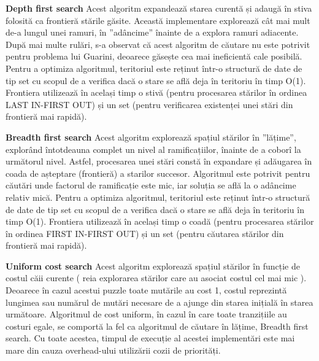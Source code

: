 \documentclass{article}
\begin{document}
    
   \textbf{ Depth first search} \hfill \break  
        Acest algoritm expandează starea curentă și adaugă în stiva folosită ca frontieră stările găsite. Această implementare explorează cât mai mult de-a lungul unei ramuri, în ”adâncime” înainte de a explora ramuri adiacente. După mai multe rulări, s-a observat că acest algoritm de căutare nu este potrivit pentru problema lui Guarini, deoarece găsește cea mai ineficientă cale posibilă.
        \hfill \break
        Pentru a optimiza algoritmul, teritoriul este reținut într-o structură de date de tip set cu scopul de a verifica dacă o stare se află deja în teritoriu în timp O(1). Frontiera utilizează în același timp o stivă (pentru procesarea stărilor în ordinea LAST IN-FIRST OUT) și un set (pentru verificarea existenței unei stări din frontieră mai rapidă).
        
        
    \textbf{Breadth first search}\hfill \break
        Acest algoritm explorează spațiul stărilor în ”lățime”, explorând întotdeauna complet un nivel al ramificațiilor, înainte de a coborî la următorul nivel. Astfel, procesarea unei stări constă în expandare și adăugarea în coada de așteptare (frontieră) a starilor succesor. Algoritmul este potrivit pentru căutări unde factorul de ramificație este mic, iar soluția se află la o adâncime relativ mică.\hfill \break
        Pentru a optimiza algoritmul, teritoriul este reținut într-o structură de date de tip set cu scopul de a verifica dacă o stare se află deja în teritoriu în timp O(1). Frontiera utilizează în același timp o coadă (pentru procesarea stărilor în ordinea FIRST IN-FIRST OUT) și un set (pentru căutarea stărilor din frontieră mai rapidă).

            
    \textbf{Uniform cost search}\hfill \break
        Acest algoritm explorează spațiul stărilor în funcție de costul căii curente ( reia explorarea stărilor care au asociat costul cel mai mic ). Deoarece în cazul acestui puzzle toate mutările au cost 1, costul reprezintă lungimea sau numărul de mutări necesare de a ajunge din starea inițială în starea următoare. Algoritmul de cost uniform, în cazul în care toate tranzițiile au costuri egale, se comportă la fel ca algoritmul de căutare în lățime, Breadth first search.
        Cu toate acestea, timpul de execuție al acestei implementări este mai mare din cauza overhead-ului utilizării cozii de priorități.
\end{document}
